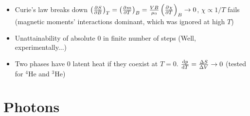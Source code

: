 \documentclass{article}
\theoremstyle{remark}
\newcommand{\ppdv}[4][]{\left(\pdv[#1]{#2}{#3}\right)_{#4}}
\begin{document}
\begin{enumerate}
\begin{itemize}
            \item Curie's law breaks down $\ppdv{S}{B}{T}=\ppdv{m}{T}{B}=\frac{VB}{\mu_0}\ppdv{\chi}{T}{B}\rightarrow0$, $\chi\propto1/T$ fails (magnetic moments' interactions dominant, which was ignored at high $T$)
            \item Unattainability of absolute 0 in finite number of steps (Well, experimentally...)
            \item Two phases have 0 latent heat if they coexist at $T=0$. $\dv{p}{T}=\frac{\Delta S}{\Delta V}\rightarrow0$ (tested for $^4$He and $^3$He)
        \end{itemize}
\end{enumerate}

\section*{Photons}
\end{document}
